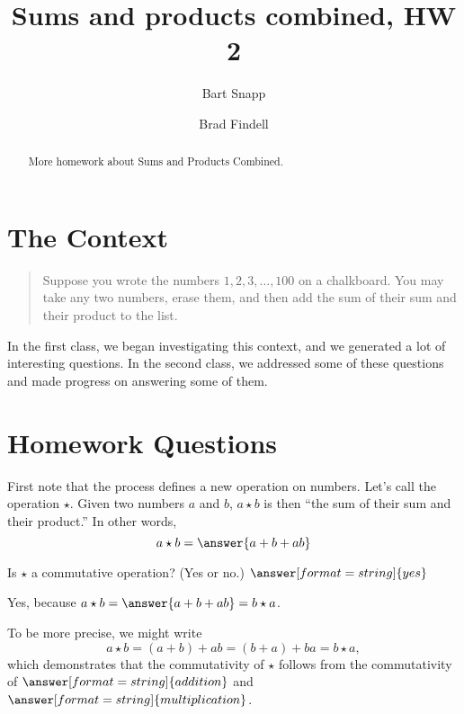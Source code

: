 \documentclass{ximera}
\title{Sums and products combined, HW 2}
\author{Bart Snapp \and Brad Findell}
\begin{document}
\begin{abstract}
More homework about Sums and Products Combined. 
\end{abstract}
\maketitle


\section*{The Context}
\begin{quote}
Suppose you wrote the numbers $1,2,3,\dots,100$ on a chalkboard. You
may take any two numbers, erase them, and then add the sum of their
sum and their product to the list.
\end{quote}

In the first class, we began investigating this context, and we generated a lot of interesting questions.  
In the second class, we addressed some of these questions and made progress on answering some of them.  

\section*{Homework Questions}

\begin{problem}
First note that the process defines a new operation on numbers.  Let's call the operation $\star$.  Given two numbers $a$ and $b$,  $a\star b$ is then ``the sum of their sum and their product.''    In other words, 
\[
a\star b = \answer{a+b+ab}
\]
\end{problem}

\begin{problem}
Is $\star$ a commutative operation?  (Yes or no.) $\answer[format=string]{yes}$

\begin{explanation}
Yes, because $a\star b = \answer{a+b+ab}  = b\star a$.  

\begin{question}
To be more precise, we might write 
\[
a\star b = (a+b)+ab= (b+a)+ba = b\star a,
\]
which demonstrates that the commutativity of $\star$ follows from the commutativity of 
$\answer[format=string]{addition}$ and $\answer[format=string]{multiplication}$. 
\end{question}
\end{explanation}
\end{problem}
\end{document}
